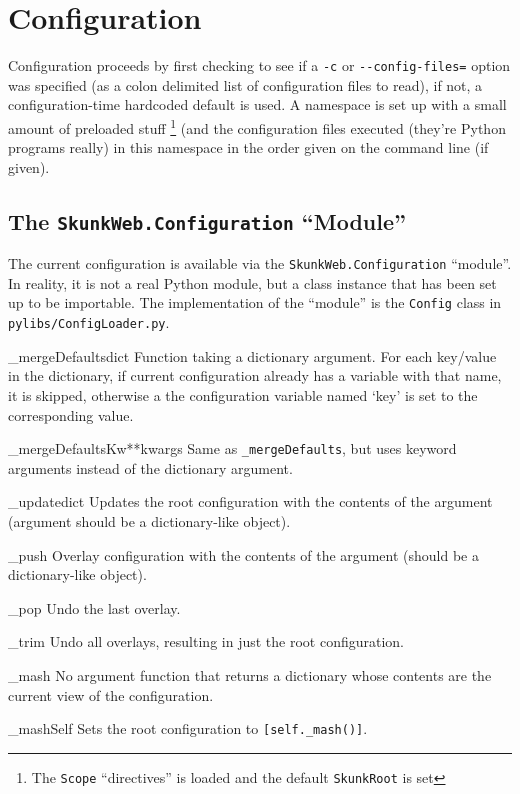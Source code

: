 \documentclass{manual}
\begin{document}
\section{Configuration}
Configuration proceeds by first checking to see if a \verb!-c! or
\verb!--config-files=! option was specified (as a colon delimited list
of configuration files to read), if not, a configuration-time
hardcoded default is used.  A namespace is set up with a small amount
of preloaded stuff \footnote{The \texttt{Scope} ``directives'' is loaded and the default \texttt{SkunkRoot} is set}
(and the configuration files executed (they're
Python programs really) in this namespace in the order given on the
command line (if given).

\subsection{The \texttt{SkunkWeb.Configuration} ``Module''}

The current configuration is available via the
\texttt{SkunkWeb.Configuration} ``module''.  In reality, it is not a
real Python module, but a class instance that has been set up to be
importable.  The implementation of the ``module'' is the
\texttt{Config} class in  \verb!pylibs/ConfigLoader.py!.

\begin{methoddesc}{\_mergeDefaults}{dict} Function taking a dictionary
argument. For each key/value in the dictionary, if current
configuration already has a variable with that name, it is skipped,
otherwise a the configuration variable named `key' is set to the
corresponding value. 
\end{methoddesc}
\begin{methoddesc}{\_mergeDefaultsKw}{**kwargs}  Same as
\texttt{\_mergeDefaults}, but uses keyword arguments instead of the
dictionary argument. 
\end{methoddesc}
\begin{methoddesc}{\_update}{dict} Updates the root configuration with the
contents of the argument (argument should be a dictionary-like
object). 
\end{methoddesc}
\begin{methoddesc}{\_push}{} Overlay configuration with the contents
of the argument (should be a dictionary-like object). 
\end{methoddesc}
\begin{methoddesc}{\_pop}{} Undo the last overlay.
\end{methoddesc}
\begin{methoddesc}{\_trim}{} Undo all overlays, resulting in just the
root configuration. 
\end{methoddesc}
\begin{methoddesc}{\_mash}{} No argument function that returns a
dictionary whose contents are the current view of the configuration.
\end{methoddesc}
\begin{methoddesc}{\_mashSelf}{} Sets the root configuration to
\verb![self._mash()]!. 
\end{methoddesc}
\end{document}
